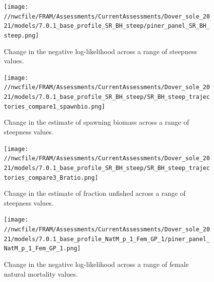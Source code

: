 \documentclass[11pt,
  english,
  a4paper,
]{article}
\begin{document}
\tagmcend\tagstructend


\begin{figure}
\centering
\texttt{[image: //nwcfile/FRAM/Assessments/CurrentAssessments/Dover\_sole\_2021/models/7.0.1\_base\_profile\_SR\_BH\_steep/piner\_panel\_SR\_BH\_steep.png]}
\caption{Change in the negative log-likelihood across a range of steepness values.\label{fig:h-profile}}
\end{figure}

\tagmcend\tagstructend


\begin{figure}
\centering
\texttt{[image: //nwcfile/FRAM/Assessments/CurrentAssessments/Dover\_sole\_2021/models/7.0.1\_base\_profile\_SR\_BH\_steep/SR\_BH\_steep\_trajectories\_compare1\_spawnbio.png]}
\caption{Change in the estimate of spawning biomass across a range of steepness values.\label{fig:h-ssb}}
\end{figure}

\tagmcend\tagstructend


\begin{figure}
\centering
\texttt{[image: //nwcfile/FRAM/Assessments/CurrentAssessments/Dover\_sole\_2021/models/7.0.1\_base\_profile\_SR\_BH\_steep/SR\_BH\_steep\_trajectories\_compare3\_Bratio.png]}
\caption{Change in the estimate of fraction unfished across a range of steepness values.\label{fig:h-depl}}
\end{figure}

\tagmcend\tagstructend


\begin{figure}
\centering
\texttt{[image: //nwcfile/FRAM/Assessments/CurrentAssessments/Dover\_sole\_2021/models/7.0.1\_base\_profile\_NatM\_p\_1\_Fem\_GP\_1/piner\_panel\_NatM\_p\_1\_Fem\_GP\_1.png]}
\caption{Change in the negative log-likelihood across a range of female natural mortality values.\label{fig:m-profile}}
\end{figure}
\end{document}
